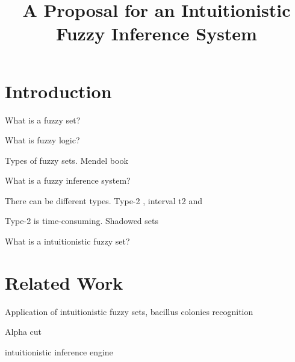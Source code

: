 \documentclass[conference]{IEEEtran}
\begin{document}
\title{A Proposal for an Intuitionistic Fuzzy Inference System}


\author{
  }

\maketitle

\begin{abstract}

\end{abstract}

\IEEEpeerreviewmaketitle



\section{Introduction}

What is a fuzzy set? \cite{zadeh1965fuzzy}

What is fuzzy logic? \cite{klir1995fuzzy}

Types of fuzzy sets. Mendel book \cite{mendel2001uncertain}

What is a fuzzy inference system?

There can be different types. Type-2 \cite{mendel2002type}, interval
t2 \cite{liang2000interval} and \cite{mendel2006interval}

Type-2 is time-consuming. Shadowed sets \cite{pedrycz1998shadowed}

What is a intuitionistic fuzzy set? \cite{atanassov1986intuitionistic}
\cite{atanassov2003intuitionistic} \cite {despi2013generalised}

\section{Related Work}

Application of intuitionistic fuzzy sets, bacillus colonies
recognition \cite{davarzani2013novel}

Alpha cut \cite{sharma2011cut} \cite{sharma2011cutgroups}

intuitionistic inference engine \cite{cornelis2001compositional}
\end{document}
